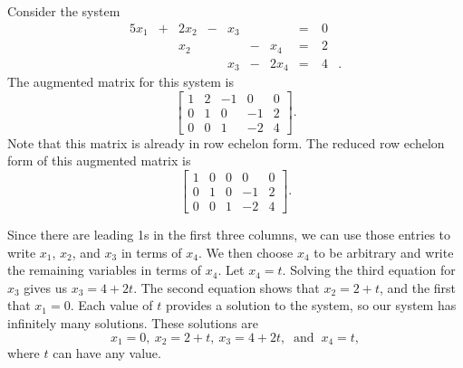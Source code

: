 Consider the system
\begin{alignat*}{5}
{}x_1 	&{+}		&{2}x_2		&{}-{}	&{}x_3	&{}		&{} 			&{}={}	& \ 0&{}   \\
{}		&{} 		&{}x_2 		&{}		&{}		&{}-{}	&{}x_4 	&{}={} 	& \ 2&{} \\
{}			&{}		&{}	&{}{} 			&{}x_3	&{}-{}	&{2}x_4		&{}={} 	& \ 4&{.}
\end{alignat*}
The augmented matrix for this system is 
\[\left[ \begin{array}{ccrr|c} 1 & 2 & -1 & 0 & 0 \\ 0 & 1 & 0 & -1 & 2 \\ 0 & 0 & 1 & -2 & 4 \end{array} \right].\]
Note that this matrix is already in row echelon form. The reduced row echelon form of this augmented matrix is 
\begin{equation} \label{eq:Ex_rref}
\left[ \begin{array}{cccr|c} 1 & 0 & 0 & 0 & 0 \\ 0 & 1 & 0 & -1 & 2 \\ 0 & 0 & 1 & -2 & 4 \end{array} \right].
\end{equation}

Since there are leading 1s in the first three columns, we can use those entries to write $x_1$, $x_2$, and $x_3$ in terms of $x_4$. We then choose $x_4$ to be arbitrary and write the remaining variables in terms of $x_4$. Let $x_4 = t$. Solving the third equation for $x_3$ gives us $x_3 = 4+2t$. The second equation shows that $x_2 = 2+t$, and the first that $x_1 = 0$. Each value of $t$ provides a solution to the system, so our system has infinitely many solutions. These solutions are 
\[x_1 = 0, \ x_2 = 2+t, \ x_3 = 4+2t, \ \text{ and } \ x_4 = t,\]
where $t$ can have any value. 

